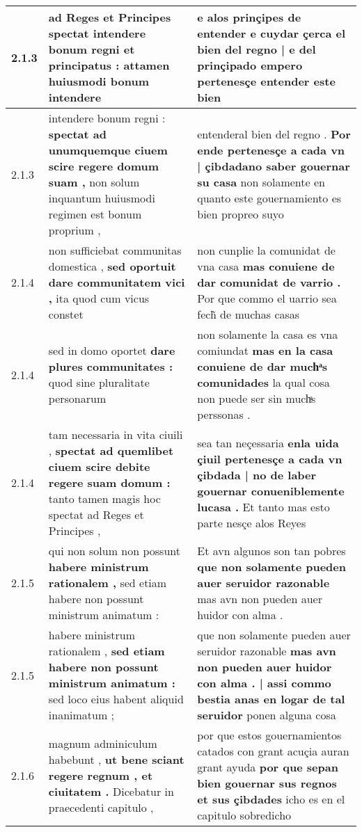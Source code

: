 \begin{tabular}{|p{1cm}|p{6.5cm}|p{6.5cm}|}
2.1.3 & ad Reges et Principes spectat \textbf{ intendere bonum regni et principatus : } attamen huiusmodi bonum intendere & e alos prinçipes de entender \textbf{ e cuydar çerca el bien del regno | e del prinçipado } empero pertenesçe entender este bien \\\hline
2.1.3 & intendere bonum regni : \textbf{ spectat ad unumquemque ciuem scire regere domum suam , } non solum inquantum huiusmodi regimen est bonum proprium , & entenderal bien del regno . \textbf{ Por ende pertenesçe a cada vn | çibdadano saber gouernar su casa } non solamente en quanto este gouernamiento es bien propreo suyo \\\hline
2.1.4 & non sufficiebat communitas domestica , \textbf{ sed oportuit dare communitatem vici , } ita quod cum vicus constet & non cunplie la comunidat de vna casa \textbf{ mas conuiene de dar comunidat de varrio . } Por que commo el uarrio sea fech̃ de muchas casas \\\hline
2.1.4 & sed in domo oportet \textbf{ dare plures communitates : } quod sine pluralitate personarum & non solamente la casa es vna comiundat \textbf{ mas en la casa conuiene de dar muchͣs comunidades } la qual cosa non puede ser sin muchͣs perssonas . \\\hline
2.1.4 & tam necessaria in vita ciuili , \textbf{ spectat ad quemlibet ciuem scire debite regere suam domum : } tanto tamen magis hoc spectat ad Reges et Principes , & sea tan neçessaria \textbf{ enla uida çiuil pertenesçe a cada vn çibdada | no de laber gouernar conueniblemente lucasa . } Et tanto mas esto parte nesçe alos Reyes \\\hline
2.1.5 & qui non solum non possunt \textbf{ habere ministrum rationalem , } sed etiam habere non possunt ministrum animatum : & Et avn algunos son tan pobres \textbf{ que non solamente pueden auer seruidor razonable } mas avn non pueden auer huidor con alma . \\\hline
2.1.5 & habere ministrum rationalem , \textbf{ sed etiam habere non possunt ministrum animatum : } sed loco eius habent aliquid inanimatum ; & que non solamente pueden auer seruidor razonable \textbf{ mas avn non pueden auer huidor con alma . | assi commo bestia anas en logar de tal seruidor } ponen alguna cosa \\\hline
2.1.6 & magnum adminiculum habebunt , \textbf{ ut bene sciant regere regnum , et ciuitatem . } Dicebatur in praecedenti capitulo , & por que estos gouernamientos catados con grant acuçia auran grant ayuda \textbf{ por que sepan bien gouernar sus regnos et sus çibdades } icho es en el capitulo sobredicho \\\hline

\end{tabular}
